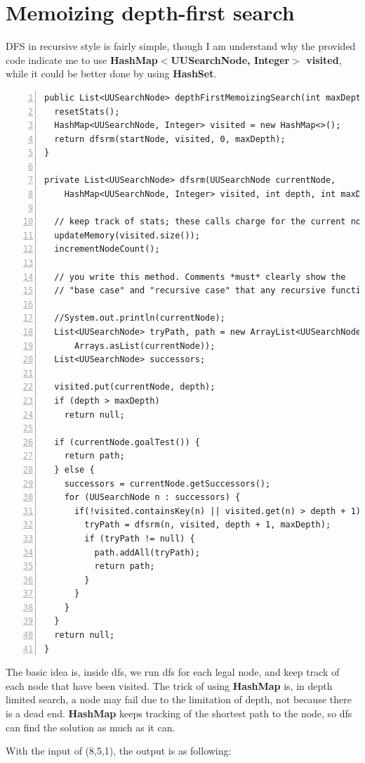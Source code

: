 \documentclass{article}
\begin{document}
\section{Memoizing depth-first search}

DFS in recursive style is fairly simple, though I am understand why the provided code indicate me to use \textbf{HashMap$<$UUSearchNode, Integer$>$ visited}, while it could be better done by using \textbf{HashSet}. 

\begin{lstlisting}[numbers=left]
public List<UUSearchNode> depthFirstMemoizingSearch(int maxDepth) {
  resetStats();
  HashMap<UUSearchNode, Integer> visited = new HashMap<>();
  return dfsrm(startNode, visited, 0, maxDepth);
}

private List<UUSearchNode> dfsrm(UUSearchNode currentNode,
    HashMap<UUSearchNode, Integer> visited, int depth, int maxDepth) {

  // keep track of stats; these calls charge for the current node
  updateMemory(visited.size());
  incrementNodeCount();

  // you write this method. Comments *must* clearly show the
  // "base case" and "recursive case" that any recursive function has.

  //System.out.println(currentNode);
  List<UUSearchNode> tryPath, path = new ArrayList<UUSearchNode>(
      Arrays.asList(currentNode));
  List<UUSearchNode> successors;

  visited.put(currentNode, depth);
  if (depth > maxDepth)
    return null;      
  
  if (currentNode.goalTest()) {
    return path;
  } else {
    successors = currentNode.getSuccessors();
    for (UUSearchNode n : successors) {
      if(!visited.containsKey(n) || visited.get(n) > depth + 1) {
        tryPath = dfsrm(n, visited, depth + 1, maxDepth);
        if (tryPath != null) {
          path.addAll(tryPath);
          return path;
        }
      }
    }
  }
  return null;
}
\end{lstlisting}

The basic idea is, inside dfs, we run dfs for each legal node, and keep track of each node that have been visited. The trick of using \textbf{HashMap} is, in depth limited search, a node may fail due to the limitation of depth, not because there is a dead end. \textbf{HashMap} keeps tracking of the shortest path to the node, so dfs can find the solution as much as it can.

With the input of (8,5,1), the output is as following:
\end{document}
